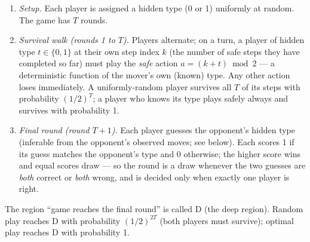\documentclass[11pt]{article}
\theoremstyle{remark}
\begin{document}
\begin{enumerate}
\item \emph{Setup.} Each player is assigned a hidden type (0 or 1) uniformly at random. The game has $T$ rounds.
\item \emph{Survival walk (rounds 1 to $T$).} Players alternate; on a turn, a player of hidden type $t \in \{0,1\}$ at their own step index $k$ (the number of safe steps they have completed so far) must play the \emph{safe} action $a = (k + t) \bmod 2$ --- a deterministic function of the mover's own (known) type. Any other action loses immediately. A uniformly-random player survives all $T$ of its steps with probability $(1/2)^T$; a player who knows its type plays safely always and survives with probability 1.
\item \emph{Final round (round $T+1$).} Each player guesses the opponent's hidden type (inferable from the opponent's observed moves; see below). Each scores 1 if its guess matches the opponent's type and 0 otherwise; the higher score wins and equal scores draw --- so the round is a draw whenever the two guesses are \emph{both} correct or \emph{both} wrong, and is decided only when exactly one player is right.
\end{enumerate}

The region ``game reaches the final round'' is called D (the deep region). Random play reaches D with probability $(1/2)^{2T}$ (both players must survive); optimal play reaches D with probability 1.
\end{document}
